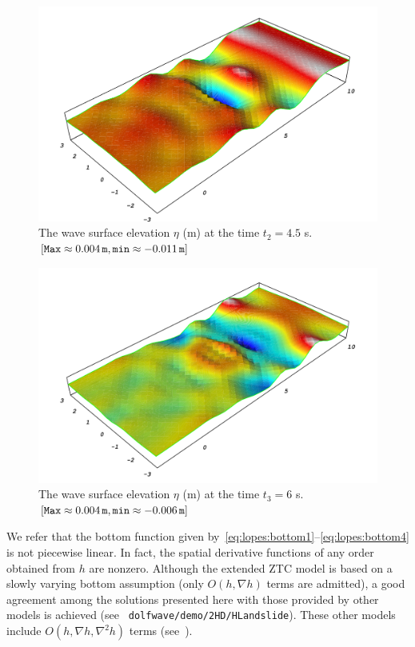 \begin{figure}
\begin{center}
\includegraphics[width=\largefig]{chapters/lopes/pdf/eta45.pdf}
\caption{The wave surface elevation $\eta$ (m)
   at the time  $t_2=4.5$ s. $[{\tt Max}\approx 0.004\, {\tt m},
    {\tt min}\approx-0.011\, {\tt m}]$}
\label{fig:lopes:objectsurface2}
\end{center}
\end{figure}
\begin{figure}
\begin{center}
\includegraphics[width=\largefig]{chapters/lopes/pdf/eta6.pdf}
\caption{The  wave surface elevation $\eta$ (m)
   at the time  $t_3=6$ s. $[{\tt Max}\approx 0.004\, {\tt m},
    {\tt min}\approx -0.006\,{\tt m}]$}
\label{fig:lopes:objectsurface3}
\end{center}
\end{figure}

We refer that the bottom function given
by~\eqref{eq:lopes:bottom1}--\eqref{eq:lopes:bottom4} is not
piecewise linear. In fact, the spatial derivative functions
of any order obtained from $h$ are nonzero. Although the
extended ZTC model is based on a slowly varying bottom
assumption (only $O(h,\nabla h)$ terms are admitted), a good
agreement among the solutions presented here with those
provided by other models is achieved (see {\tt
  dolfwave/demo/2HD/HLandslide}).  These other
models include $O(h,\nabla h,\nabla^2 h)$ terms
(see~\cite{LopesPereiraTrabucho}).

